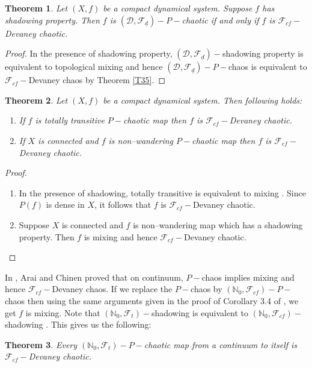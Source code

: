 \documentclass{amsart}[12pt, papera4]
\newtheorem{theorem}{Theorem}[section]
\theoremstyle{definition}
\theoremstyle{remark}
\numberwithin{equation}{section}
\def\N{{\mathbb N}}
\def\F{{\mathscr{F}}}
\begin{document}
\begin{theorem}\label{3.7}
	Let $(X,f)$ be a compact dynamical system. Suppose $f$ has shadowing property. Then $f$ is $(\mathscr{D},\F_{\underline{d}})-P-$chaotic if and only if $f$ is $\F_{cf}-$Devaney chaotic.
\end{theorem}
\begin{proof}
	In the presence of shadowing property, $(\mathscr{D},\F_{\underline{d}})-$shadowing property is equivalent to topological mixing \cite{Oprocha2} and hence $(\mathscr{D},\F_{\underline{d}})-P-$chaos is equivalent to $\F_{cf}-$Devaney chaos by Theorem \ref{T35}.
\end{proof}




\begin{theorem}\label{3.8}
	Let $(X,f)$ be a compact dynamical system. Then following holds:
	\begin{enumerate}
		\item If $f$ is totally transitive $P-$chaotic map then $f$ is $\F_{cf}-$Devaney chaotic.
		\item If $X$ is connected and $f$ is non--wandering $P-$chaotic map then $f$ is $\F_{cf}-$Devaney chaotic. 
	\end{enumerate} 
\end{theorem}
\begin{proof}
	\begin{enumerate}
		\item In the presence of shadowing, totally transitive is equivalent to mixing \cite{TKS2}. Since $P(f)$ is dense in $X$, it follows that $f$ is $\F_{cf}-$Devaney chaotic. 
		\item Suppose $X$ is connected and $f$ is non--wandering map which has a shadowing property. Then $f$ is mixing \cite{TKS2} and hence $\F_{cf}-$Devaney chaotic.  
\end{enumerate} 	\end{proof}


\smallskip
\noindent In \cite{Arai}, Arai and Chinen proved that on continuum, $P-$chaos implies mixing and hence $\F_{cf}-$Devaney chaos. If we replace the $P-$chaos by $(\N_0,\F_{cf})-P-$chaos then using the same arguments given in the proof of Corollary 3.4 of \cite{Arai}, we get $f$ is mixing. Note that $(\N_0,\F_{t})-$shadowing is equivalent to $(\N_0,\F_{cf})-$shadowing \cite{Oprocha}. This gives us the following:


\begin{theorem} \label{C8}
	Every $(\N_0,\mathscr{F}_{t})-P-$chaotic map from a continuum to itself is $\mathscr{F}_{cf}-$Devaney chaotic.
\end{theorem}
\end{document}
